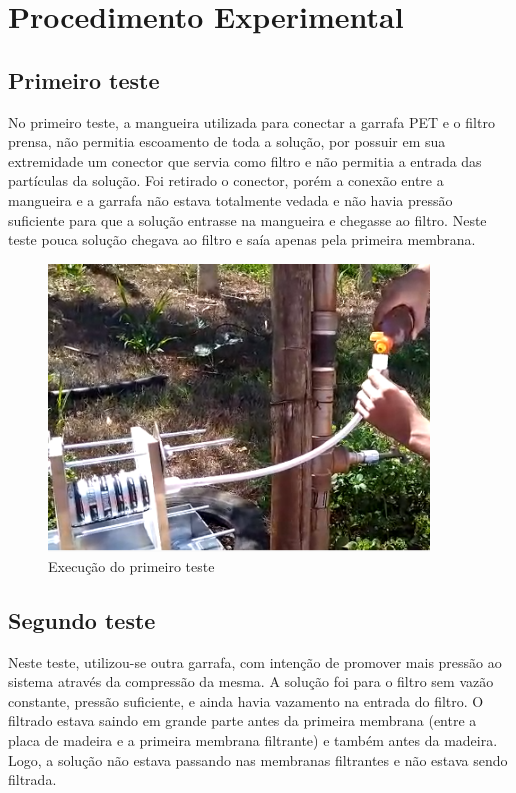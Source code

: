 \chapter{Procedimento Experimental}\label{procedimento}

\section{Primeiro teste}\label{sec:primeiro_teste}

No primeiro teste, a mangueira utilizada para conectar a garrafa PET e o filtro
prensa, não permitia escoamento de toda a solução, por possuir em sua
extremidade um conector que servia como filtro e não permitia a entrada das
partículas da solução. Foi retirado o conector, porém a conexão entre a
mangueira e a garrafa não estava totalmente vedada e não havia pressão
suficiente para que a solução entrasse na mangueira e chegasse ao filtro. Neste
teste pouca solução chegava ao filtro e saía apenas pela primeira membrana.

\begin{figure}[H]
  \centering
  \includegraphics[width=0.9\textwidth]{figuras/primeiro_teste.png}
  \caption{Execução do primeiro teste\label{fig:primeiro_teste}}
\end{figure}


\section{Segundo teste}\label{sec:segundo_teste}

Neste teste, utilizou-se outra garrafa, com intenção de promover mais pressão ao
sistema através da compressão da mesma. A solução foi para o filtro sem vazão
constante, pressão suficiente, e ainda havia vazamento na entrada do filtro. O
filtrado estava saindo em grande parte antes da primeira membrana (entre a placa
de madeira e a primeira membrana filtrante) e também antes da madeira. Logo, a
solução não estava passando nas membranas filtrantes e não estava sendo
filtrada.

